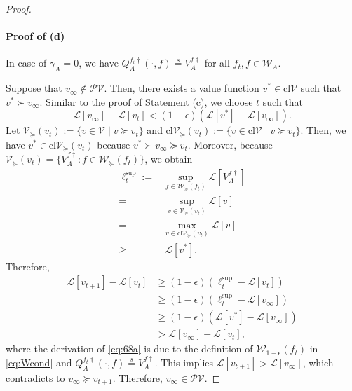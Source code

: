\documentclass{acml}
\providecommand{\eqs}{\stackrel{s}{=}}
\begin{document}
\begin{proof}
	\paragraph{Proof of (d)}
	In case of $\gamma_A = 0$, we have $Q_A^{f_t\dag}(\cdot,f) \eqs V_A^{f\dag}$ for all $f_t, f\in\mathcal{W}_A$.
	
	
	Suppose that $v_\infty \notin \mathcal{PV}$. 
	Then, there exists a value function $v^*\in\mathrm{cl}\mathcal{V}$ such that $v^* \succ v_\infty$.
	Similar to the proof of Statement (c), we choose $t$ such that
	\begin{equation}
		\mathcal{L}[v_\infty] - \mathcal{L}[v_t] < (1 - \epsilon) (\mathcal{L}[v^*] - \mathcal{L}[v_\infty]).
	\end{equation}
	Let $\mathcal{V}_\succcurlyeq(v_t):=\{v\in\mathcal{V}\mid v\succcurlyeq v_t\}$ and $\mathrm{cl}\mathcal{V}_\succcurlyeq(v_t):=\{v\in\mathrm{cl}\mathcal{V}\mid v\succcurlyeq v_t\}$.
	Then, we have $v^* \in \mathrm{cl}\mathcal{V}_\succcurlyeq(v_t)$ because $v^* \succ v_\infty \succcurlyeq v_t$.
	Moreover, because $\mathcal{V}_\succcurlyeq(v_t) = \{V_A^{f\dag} : f \in \mathcal{W}_{\succcurlyeq}(f_t)\}$, 
	we obtain
	\begin{subequations}
		\begin{align}
			\ell_t^{\sup} :=& \sup_{f \in \mathcal{W}_\succcurlyeq(f_t)} \mathcal{L}[V_A^{f\dag}] \\
			=& ~\sup_{v\in\mathcal{V}_\succcurlyeq(v_t)} \mathcal{L}[v]\\
			=& \max_{v\in\mathrm{cl}\mathcal{V}_\succcurlyeq(v_t)} \mathcal{L}[v]\\
			\ge&~ \mathcal{L}[v^*].
		\end{align}
	\end{subequations}
	Therefore, 
	\begin{subequations}
		\begin{align}
			\mathcal{L}[v_{t+1}] - \mathcal{L}[v_{t}]
			&\ge (1 - \epsilon) (\ell_t^{\sup} - \mathcal{L}[v_{t}]) \label{eq:68a}\\
			&\ge (1 - \epsilon) (\ell_t^{\sup} - \mathcal{L}[v_\infty]) \\            
			&\ge (1 - \epsilon) (\mathcal{L}[v^*] - \mathcal{L}[v_\infty]) \\            
			&> \mathcal{L}[v_\infty] - \mathcal{L}[v_t] ,
		\end{align}
	\end{subequations}
	where the derivation of \cref{eq:68a} is due to the definition of $\mathcal{W}_{1-\epsilon}(f_t)$ in \cref{eq:Wcond} and $Q_A^{f_t\dag}(\cdot,f) \eqs V_A^{f\dag}$. 
	This implies $\mathcal{L}[v_{t+1}] > \mathcal{L}[v_\infty]$, which contradicts to $v_\infty \succcurlyeq v_{t+1}$. 
	Therefore, $v_\infty \in \mathcal{PV}$.
\end{proof}
\end{document}
